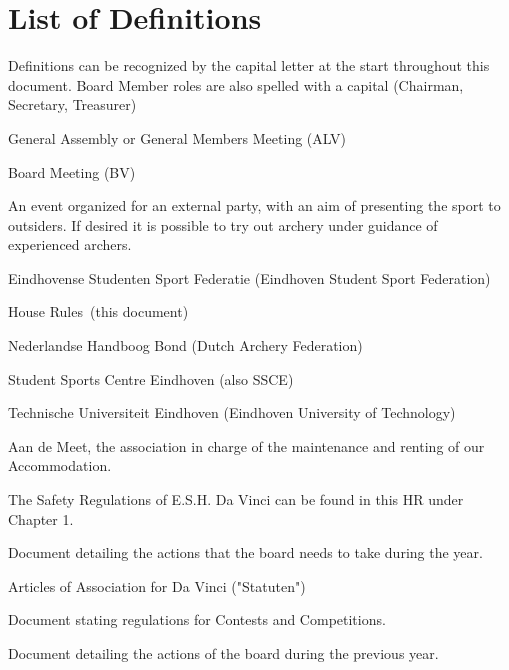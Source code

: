 \documentclass[a4paper]{article}
\newcommand{\Abr}{Administrative Regulations} %
\newcommand{\Asta}{Bylaws} %
\newcommand{\Ahr}{House Rules} %
\newcommand{\Asr}{Safety Rules} %
\newcommand{\Awr}{Contest Rules} %
\newcommand{\Ajv}{Annual Report} %
\begin{document}
\newpage

\tableofcontents
\pagebreak
\section*{List of Definitions}
{\g Definitions can be recognized by the capital letter at the start throughout this document. Board Member roles are also spelled with a capital (Chairman, Secretary, Treasurer)}

\begin{description}[font=\sffamily\bfseries, leftmargin=1cm, style=nextline]
  \item[GA]
    General Assembly or General Members Meeting (ALV)
  \item[BM]
    Board Meeting (BV)
  \item[Workshop]
    An event organized for an external party, with an aim of presenting the sport to outsiders. If desired it is possible to try out archery under guidance of experienced archers.
    \item[ESSF]
    Eindhovense Studenten Sport Federatie (Eindhoven Student Sport Federation)
    \item[HR]
    \Ahr\ (this document)
    \item[NHB]
    Nederlandse Handboog Bond (Dutch Archery Federation)
    \item[SSC]
    Student Sports Centre Eindhoven (also SSCE)
    \item[TU/e]
    Technische Universiteit Eindhoven (Eindhoven University of Technology)
    \item[ADM]
    Aan de Meet, the association in charge of the maintenance and renting of our Accommodation.
    \item[\Asr]
    The Safety Regulations of E.S.H. Da Vinci can be found in this HR under Chapter 1.
\item[\Abr] Document detailing the actions that the board needs to take during the year.
\item[\Asta] Articles of Association for Da Vinci ("Statuten")
\item[\Awr] Document stating regulations for Contests and Competitions.
\item[\Ajv] Document detailing the actions of the board during the previous year.
    

\end{description}
\end{document}
